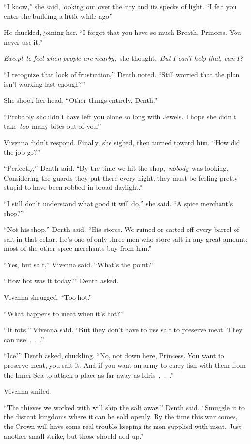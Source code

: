 “I know,” she said, looking out over the city and its specks of light. “I felt you enter the building a little while ago.”

He chuckled, joining her. “I forget that you have so much Breath, Princess. You never use it.”

\textit{Except to feel when people are nearby,}~she thought.~\textit{But I can’t help that, can I?}

“I recognize that look of frustration,” Denth noted. “Still worried that the plan isn’t working fast enough?”

She shook her head. “Other things entirely, Denth.”

“Probably shouldn’t have left you alone so long with Jewels. I hope she didn’t take~\textit{too}~many bites out of you.”

Vivenna didn’t respond. Finally, she sighed, then turned toward him. “How did the job go?”

“Perfectly,” Denth said. “By the time we hit the shop,~\textit{nobody}~was looking. Considering the guards they put there every night, they must be feeling pretty stupid to have been robbed in broad daylight.”

“I still don’t understand what good it will do,” she said. “A spice merchant’s shop?”

“Not his shop,” Denth said. “His stores. We ruined or carted off every barrel of salt in that cellar. He’s one of only three men who store salt in any great amount; most of the other spice merchants buy from him.”

“Yes, but salt,” Vivenna said. “What’s the point?”

“How hot was it today?” Denth asked.

Vivenna shrugged. “Too hot.”

“What happens to meat when it’s hot?”

“It rots,” Vivenna said. “But they don’t have to use salt to preserve meat. They can use~.~.~.”

“Ice?” Denth asked, chuckling. “No, not down here, Princess. You want to preserve meat, you salt it. And if you want an army to carry fish with them from the Inner Sea to attack a place as far away as Idris~.~.~.”

Vivenna smiled.

“The thieves we worked with will ship the salt away,” Denth said. “Smuggle it to the distant kingdoms where it can be sold openly. By the time this war comes, the Crown will have some real trouble keeping its men supplied with meat. Just another small strike, but those should add up.”

